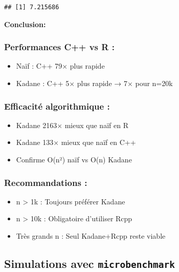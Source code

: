 \documentclass[
]{article}
\providecommand{\tightlist}{%
  \setlength{\itemsep}{0pt}\setlength{\parskip}{0pt}}
\begin{document}
\begin{verbatim}
## [1] 7.215686
\end{verbatim}

\textbf{Conclusion:}

\subsubsection{Performances C++ vs R :}\label{performances-c-vs-r}

\begin{itemize}
\tightlist
\item
  Naïf : C++ 79× plus rapide\\
\item
  Kadane : C++ 5× plus rapide → 7× pour n=20k
\end{itemize}

\subsubsection{Efficacité algorithmique
:}\label{efficacituxe9-algorithmique}

\begin{itemize}
\item
  Kadane 2163× mieux que naïf en R\\
\item
  Kadane 133× mieux que naïf en C++
\item
  Confirme O(n²) naïf vs O(n) Kadane
\end{itemize}

\subsubsection{Recommandations :}\label{recommandations}

\begin{itemize}
\tightlist
\item
  n \textgreater{} 1k : Toujours préférer Kadane\\
\item
  n \textgreater{} 10k : Obligatoire d'utiliser Rcpp\\
\item
  Très grands n : Seul Kadane+Rcpp reste viable
\end{itemize}

\subsection{\texorpdfstring{Simulations avec
\texttt{microbenchmark}}{Simulations avec microbenchmark}}\label{simulations-avec-microbenchmark}
\end{document}

